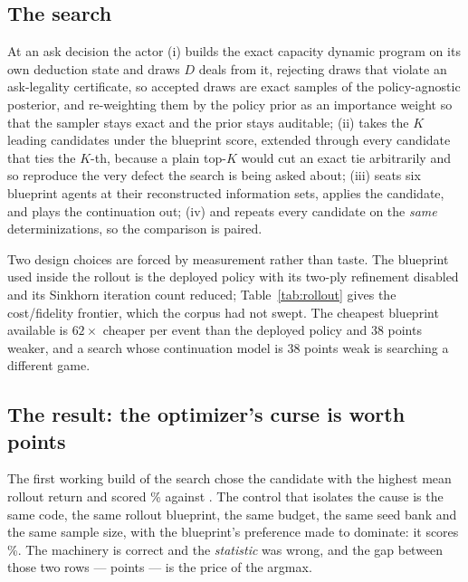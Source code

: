 \subsection{The search}
\label{sec:search-alg}

At an ask decision the actor
(i) builds the exact capacity dynamic program on its own deduction state and draws $D$ deals from
it, rejecting draws that violate an ask-legality certificate, so accepted draws are exact samples of
the policy-agnostic posterior, and re-weighting them by the policy prior as an importance weight so
that the sampler stays exact and the prior stays auditable;
(ii) takes the $K$ leading candidates under the blueprint score, extended through every candidate
that ties the $K$-th, because a plain top-$K$ would cut an exact tie arbitrarily and so reproduce the
very defect the search is being asked about;
(iii) seats six blueprint agents at their reconstructed information sets, applies the candidate, and
plays the continuation out;
(iv) and repeats every candidate on the \emph{same} determinizations, so the comparison is paired.

Two design choices are forced by measurement rather than taste. The blueprint used inside the
rollout is the deployed policy with its two-ply refinement disabled and its Sinkhorn iteration count
reduced; Table~\ref{tab:rollout} gives the cost/fidelity frontier, which the corpus had not swept.
The cheapest blueprint available is $62\times$ cheaper per event than the deployed policy and
$38$ points weaker, and a search whose continuation model is $38$ points weak is searching a
different game.

\begin{table}[t]\centering
\caption{Rollout-blueprint fidelity. Win rate against \vfive{} and single-thread throughput.
Reducing the Sinkhorn iteration count, which the corpus had not tried, is the cheap axis: it buys
most of the speed of the independent-marginal blueprint at a small fraction of its strength cost.}
\label{tab:rollout}

\end{table}

\subsection{The result: the optimizer's curse is worth \vsixCurseGap{} points}
\label{sec:search-curse}

The first working build of the search chose the candidate with the highest mean rollout return and
scored \vsixSearchUnguarded\% against \vfive{}. The control that isolates the cause is the same
code, the same rollout blueprint, the same budget, the same seed bank and the same sample size, with
the blueprint's preference made to dominate: it scores \vsixSearchControl\%. The machinery is
correct and the \emph{statistic} was wrong, and the gap between those two rows ---
\vsixCurseGap{} points --- is the price of the argmax.

